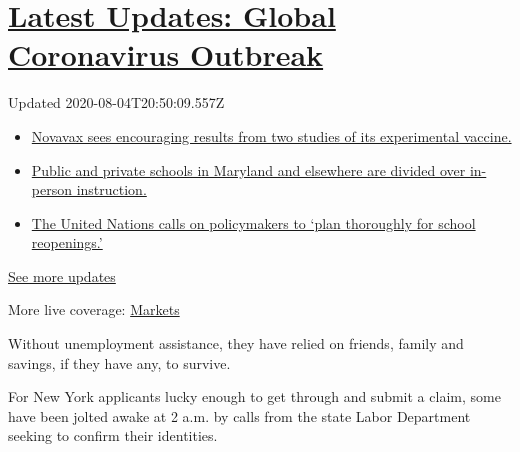 \hypertarget{latest-updates-global-coronavirus-outbreak}{%
\section{\texorpdfstring{\href{https://www.nytimes.com/2020/08/04/world/coronavirus-cases.html?action=click\&pgtype=Article\&state=default\&region=MAIN_CONTENT_1\&context=storylines_live_updates}{Latest
Updates: Global Coronavirus
Outbreak}}{Latest Updates: Global Coronavirus Outbreak}}\label{latest-updates-global-coronavirus-outbreak}}

Updated 2020-08-04T20:50:09.557Z

\begin{itemize}
\tightlist
\item
  \href{https://www.nytimes.com/2020/08/04/world/coronavirus-cases.html?action=click\&pgtype=Article\&state=default\&region=MAIN_CONTENT_1\&context=storylines_live_updates\#link-1228a480}{Novavax
  sees encouraging results from two studies of its experimental
  vaccine.}
\item
  \href{https://www.nytimes.com/2020/08/04/world/coronavirus-cases.html?action=click\&pgtype=Article\&state=default\&region=MAIN_CONTENT_1\&context=storylines_live_updates\#link-4825b93}{Public
  and private schools in Maryland and elsewhere are divided over
  in-person instruction.}
\item
  \href{https://www.nytimes.com/2020/08/04/world/coronavirus-cases.html?action=click\&pgtype=Article\&state=default\&region=MAIN_CONTENT_1\&context=storylines_live_updates\#link-50f7386d}{The
  United Nations calls on policymakers to `plan thoroughly for school
  reopenings.'}
\end{itemize}

\href{https://www.nytimes.com/2020/08/04/world/coronavirus-cases.html?action=click\&pgtype=Article\&state=default\&region=MAIN_CONTENT_1\&context=storylines_live_updates}{See
more updates}

More live coverage:
\href{https://www.nytimes.com/live/2020/08/04/business/stock-market-today-coronavirus?action=click\&pgtype=Article\&state=default\&region=MAIN_CONTENT_1\&context=storylines_live_updates}{Markets}

Without unemployment assistance, they have relied on friends, family and
savings, if they have any, to survive.

For New York applicants lucky enough to get through and submit a claim,
some have been jolted awake at 2 a.m. by calls from the state Labor
Department seeking to confirm their identities.

